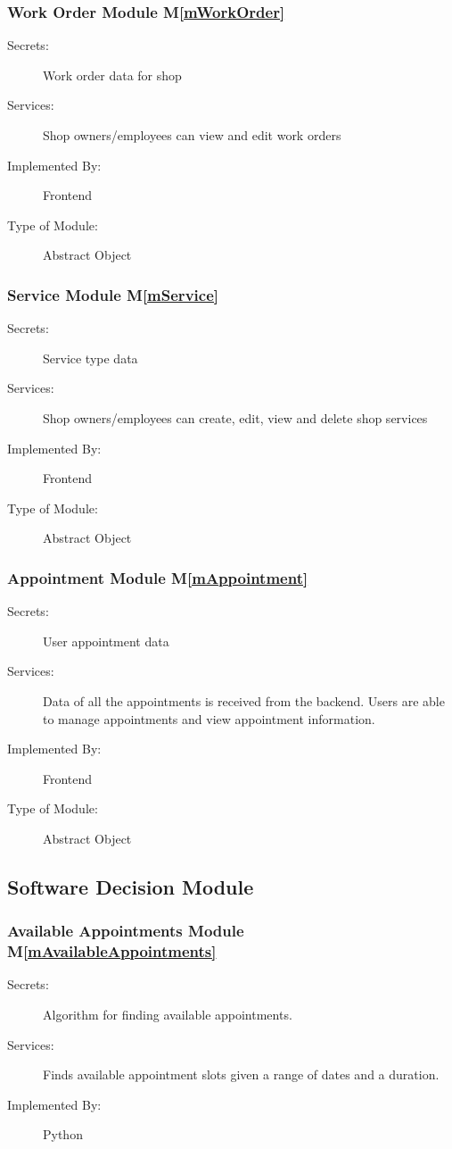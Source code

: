 \documentclass[12pt, titlepage]{article}
\newcommand{\mref}[1]{M\ref{#1}}
\begin{document}
\subsubsection{Work Order Module \mref{mWorkOrder}}

\begin{description}
\item[Secrets:]Work order data for shop
\item[Services:]Shop owners/employees can view and edit work orders
\item[Implemented By:] Frontend
\item[Type of Module:] Abstract Object
\end{description}

\subsubsection{Service Module \mref{mService}}

\begin{description}
\item[Secrets:]Service type data
\item[Services:]Shop owners/employees can create, edit, view and delete shop services
\item[Implemented By:] Frontend
\item[Type of Module:] Abstract Object
\end{description}

\subsubsection{Appointment Module \mref{mAppointment}}

\begin{description}
\item[Secrets:]User appointment data
\item[Services:]Data of all the appointments is received from the backend. Users are able to manage appointments and view appointment information.
\item[Implemented By:] Frontend
\item[Type of Module:] Abstract Object
\end{description}

\subsection{Software Decision Module}
\subsubsection{Available Appointments Module \mref{mAvailableAppointments}}
\begin{description}
\item[Secrets:]Algorithm for finding available appointments.
\item[Services:]Finds available appointment slots given a range of dates and a duration.
\item[Implemented By:] Python
\end{description}
\end{document}
